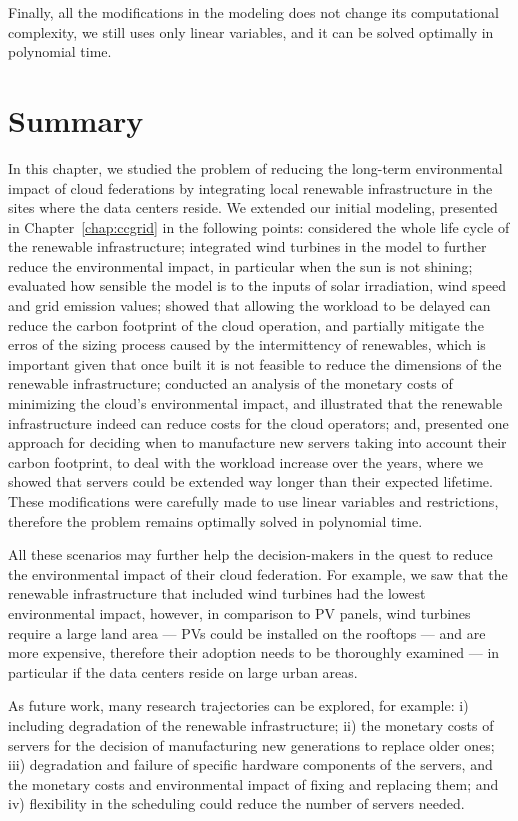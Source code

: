 Finally, all the modifications in the modeling does not change its computational complexity, we still uses only linear variables, and it can be solved optimally in polynomial time.

\section{Summary}

\label{sec:long_term_conclusion}

In this chapter, we studied the problem of reducing the long-term environmental impact of cloud federations by integrating local renewable infrastructure in the sites where the data centers reside. We extended our initial modeling, presented in Chapter~\ref{chap:ccgrid} in the following points: considered the whole life cycle of the renewable infrastructure; integrated wind turbines in the model to further reduce the environmental impact, in particular when the sun is not shining;  evaluated how sensible the model is to the inputs of solar irradiation, wind speed and grid emission values; showed that allowing the workload to be delayed can reduce the carbon footprint of the cloud operation, and partially mitigate the erros of the sizing process caused by the intermittency of renewables, which is important given that once built it is not feasible to reduce the dimensions of the renewable infrastructure;  conducted an analysis of the monetary costs of minimizing the cloud's  environmental impact, and illustrated that the renewable infrastructure indeed can reduce costs for the cloud operators; and, presented one approach for deciding when to manufacture new servers taking into account their carbon footprint, to deal with the workload increase over the years, where we showed that servers could be extended way longer than their expected lifetime. These modifications were carefully made to use linear variables and restrictions, therefore the problem remains optimally solved in polynomial time.


All these scenarios may further help the decision-makers in the quest to reduce the environmental impact of their cloud federation. For example, we saw that the renewable infrastructure that included wind turbines had the lowest environmental impact, however, in comparison to PV panels, wind turbines require a large land area --- PVs could be installed on the rooftops --- and are more expensive, therefore their adoption needs to be thoroughly examined --- in particular if the data centers reside on large urban areas. 


As future work, many research trajectories can be explored, for example: i) including degradation of the renewable infrastructure; ii) the monetary costs of servers for the decision of manufacturing new generations to replace older ones; iii) degradation and failure of specific hardware components of the servers, and the monetary costs and environmental impact of fixing and replacing them; and iv) flexibility in the scheduling could reduce the number of servers needed.
